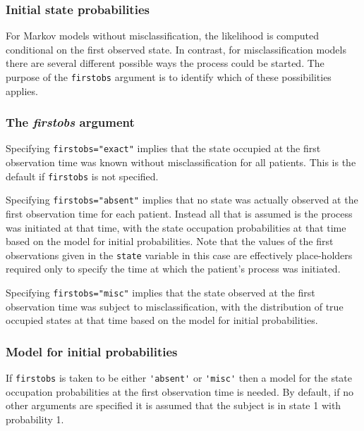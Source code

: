\documentclass{article}
\numberwithin{equation}{section}
\begin{document}
\subsubsection{Initial state probabilities}
\label{initprobs}

For Markov models without misclassification, the likelihood is computed conditional on the first observed state. In contrast, for misclassification models there are several different possible ways the process could be started. The purpose of the \verb!firstobs! argument is to identify which of these possibilities applies.

\subsubsection*{The {\it firstobs} argument}

Specifying \verb!firstobs="exact"! implies that the state occupied at the first observation time was known without misclassification for all patients. This is the default if \verb!firstobs! is not specified.

Specifying \verb!firstobs="absent"! implies that no state was actually observed at the first observation time for each patient. Instead all that is assumed is the process was initiated at that time, with the state occupation probabilities at that time based on the model for initial probabilities. Note that the values of the first observations given in the \verb!state! variable in this case are effectively place-holders required only to specify the time at which the patient's process was initiated.

Specifying \verb!firstobs="misc"! implies that the state observed at the first observation time was subject to misclassification, with the distribution of true occupied states at that time based on the model for initial probabilities.

\subsubsection*{Model for initial probabilities}

If \verb!firstobs! is taken to be either \verb!'absent'! or \verb!'misc'! then a model for the state occupation probabilities at the first observation time is needed. By default, if no other arguments are specified it is  assumed that the subject  is in state 1 with probability 1. 
\end{document}
